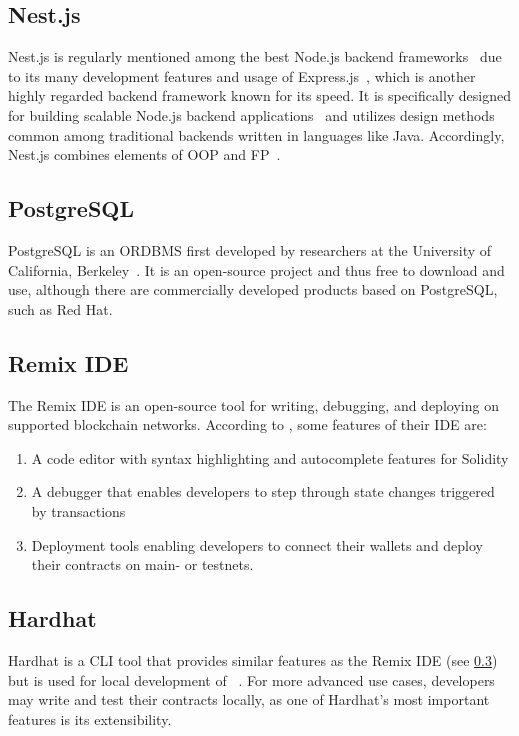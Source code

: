 \subsection{Nest.js}\label{subsec:nest.js}

Nest.js is regularly mentioned among the best Node.js backend frameworks~\autocites{clever_solution_9_2020}{labay_10_2020}{patel_top_2022} due to its many development features and usage of Express.js~\autocite{mysliwiec_documentation_nodate}, which is another highly regarded backend framework known for its speed.
It is specifically designed for building scalable Node.js backend applications~\autocite{mysliwiec_documentation_nodate} and utilizes design methods common among traditional backends written in languages like Java.
Accordingly, Nest.js combines elements of \gls{OOP} and \gls{FP}~\autocite{mysliwiec_documentation_nodate}.

\subsection{PostgreSQL}\label{subsec:postgresql}

PostgreSQL is an \gls{ORDBMS} first developed by researchers at the University of California, Berkeley~\autocite[3]{worsley_practical_2002}.
It is an open-source project and thus free to download and use, although there are commercially developed products based on PostgreSQL, such as Red Hat.

\subsection{Remix IDE}\label{subsec:remix-ide}

The Remix \gls{IDE} is an open-source tool for writing, debugging, and deploying  on supported blockchain networks.
According to \textcite{remix_project_welcome_nodate}, some features of their \gls{IDE} are:

\begin{enumerate}
    \item A code editor with syntax highlighting and autocomplete features for Solidity
    \item A debugger that enables developers to step through state changes triggered by transactions
    \item Deployment tools enabling developers to connect their wallets and deploy their contracts on main- or testnets.
\end{enumerate}

\subsection{Hardhat}\label{subsec:hardhat}

Hardhat is a \gls{CLI} tool that provides similar features as the Remix \gls{IDE} (see \cref{subsec:remix-ide}) but is used for local development of ~\autocite{hardhat_documentation_nodate}.
For more advanced use cases, developers may write and test their contracts locally, as one of Hardhat's most important features is its extensibility.